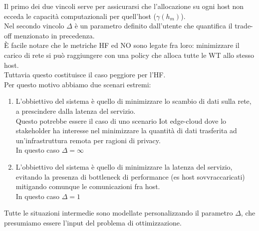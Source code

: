 \documentclass[11pt]{article}
\begin{document}
	Il primo dei due vincoli serve per assicurarsi che l'allocazione su ogni host non ecceda le capacità computazionali per quell'host ($\gamma(h_m)$). \\
	Nel secondo vincolo $\Delta$ è un parametro definito dall'utente che quantifica il trade-off menzionato in precedenza. \\
	È facile notare che le metriche HF ed NO sono legate fra loro: minimizzare il carico di rete si può raggiungere con una policy che alloca tutte le WT allo stesso host. \\
	Tuttavia questo costituisce il caso peggiore per l'HF. \\
	Per questo motivo abbiamo due scenari estremi:
	\begin{enumerate}
		\item L'obbiettivo del sistema è quello di minimizzare lo scambio di dati sulla rete, a prescindere dalla latenza del servizio. \\
		Questo potrebbe essere il caso di uno scenario Iot edge-cloud dove lo stakeholder ha interesse nel minimizzare la quantità di dati trasferita ad un'infrastruttura remota per ragioni di privacy. \\
		In questo caso $\Delta = \infty$
		\item L'obbiettivo del sistema è quello di minimizzare la latenza del servizio, evitando la presenza di bottleneck di performance (es host sovvraccaricati) mitigando comunque le comunicazioni fra host. \\
		In questo caso $\Delta = 1$
	\end{enumerate}
	Tutte le situazioni intermedie sono modellate personalizzando il parametro $\Delta$, che presumiamo essere l'input del problema di ottimizzazione.
\end{document}
